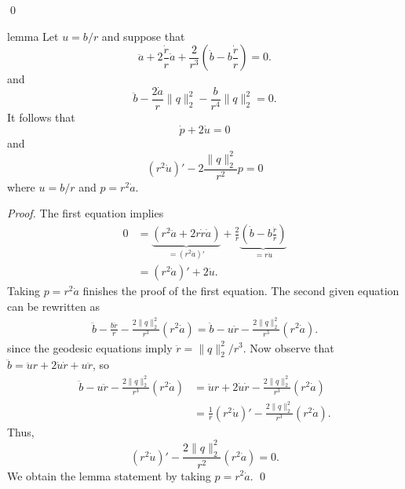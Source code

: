\documentclass{article}
\begin{document}
\qed{}

\begin{restatable}{lemma}{} \label{lemma: parallel jacobi equation}
    Let $u = b/r$ and suppose that
    \begin{equation}
        \ddot a + 2\frac{\dot r}{r}\dot a + \frac{2}{r^3}\left(\dot b - b\frac{ \dot r}{r}\right) = 0.
    \end{equation}
    and
    \begin{equation}
        \ddot b - \frac{2\dot a}{r}\|q\|_2^2 - \frac{b}{r^4} \|q\|_2^2 = 0.
    \end{equation}
    It follows that
    \begin{equation}
        \dot p + 2\dot u = 0
    \end{equation}
    and 
    \begin{equation}
        (r^2\dot u)' - 2\frac{\|q\|_2^2}{r^2}p = 0
    \end{equation}
    where $u = b/r$ and $p = r^2\dot a$.
\end{restatable}
\noindent \textit{Proof.} The first equation implies
\begin{align}
    0 &= \underbrace{(r^2\ddot a + 2r\dot r\dot a)}_{ = (r^2\dot a)'} + \frac{2}{r}\underbrace{\left(\dot b - b\frac{ \dot r}{r}\right)}_{ = r\dot u} \\
    &= (r^2\dot a)' + 2\dot u.
\end{align}
Taking $p = r^2 \dot a$ finishes the proof of the first equation. The second given equation can be rewritten as 
\begin{align}
    \ddot b  - \frac{b\ddot r}{r} - \frac{2\|q\|_2^2}{r^3}(r^2\dot a) = \ddot b - u\ddot r - \frac{2\|q\|_2^2}{r^3}(r^2\dot a).
\end{align}
since the geodesic equations imply $\ddot r = \|q\|_2^2/r^3.$ Now observe that $\ddot b = \ddot u r + 2\dot u \dot r + u\ddot r$, so 
\begin{align}
    \ddot b - u\ddot r - \frac{2\|q\|_2^2}{r^3}(r^2\dot a) &= \ddot u r  + 2\dot u \dot r - \frac{2\|q\|_2^2}{r^3}(r^2\dot a) \\
    &= \frac{1}{r}(r^2\dot u)' - \frac{2\|q\|_2^2}{r^3}(r^2\dot a).
\end{align}
Thus,
\begin{equation}
    (r^2\dot u)' - \frac{2\|q\|_2^2}{r^2}(r^2\dot a) = 0.
\end{equation}
We obtain the lemma statement by taking $p = r^2\dot a$.  
\qed{}
\end{document}
